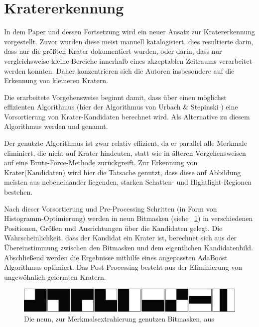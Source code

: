 
\section{Kratererkennung} %
\label{sec:craterdetection}

In dem Paper \cite{bandeira_10} und dessen Fortsetzung \cite{bandeira_12} wird ein neuer Ansatz zur Kratererkennung vorgestellt. Zuvor wurden diese meist manuell katalogisiert, dies resultierte darin, dass nur die größten Krater dokumentiert wurden, oder darin, dass nur vergleichsweise kleine Bereiche innerhalb eines akzeptablen Zeitraums verarbeitet werden konnten. Daher konzentrieren sich die Autoren insbesondere auf die Erkennung von kleineren Kratern.

Die erarbeitete Vorgehensweise beginnt damit, dass über einen möglichst effizienten Algorithmus (hier der Algorithmus von Urbach \& Stepinski \cite{urbach_stepinski_2009}) eine Vorsortierung von Krater-Kandidaten berechnet wird. Als Alternative zu diesem Algorithmus werden \cite{bandeira_07} und \cite{salamuniccar_10} genannt.

Der genutzte Algorithmus ist zwar relativ effizient, da er parallel alle Merkmale eliminiert, die nicht auf Krater hindeuten, statt wie in älteren Vorgehensweisen auf eine Brute-Force-Methode zurückgreift. Zur Erkennung von Krater(Kandidaten) wird hier die Tatsache genutzt, dass diese auf Abbildung meisten aus nebeneinander liegenden, starken Schatten- und Hightlight-Regionen bestehen.

Nach dieser Vorsortierung und Pre-Processing Schritten (in Form von Histogramm-Optimierung) werden in \cite{bandeira_10, bandeira_12} neun Bitmasken (siehe \figurename~\ref{fig:BDS12_01}) in verschiedenen Positionen, Größen und Ausrichtungen über die Kandidaten gelegt. Die Wahrscheinlichkeit, dass der Kandidat ein Krater ist, berechnet sich aus der Übereinstimmung zwischen den Bitmasken und dem eigentlichen Kandidatenbild. Abschließend werden die Ergebnisse mithilfe eines angepassten AdaBoost Algorithmus optimiert. Das Post-Processing besteht aus der Eliminierung von ungewöhnlich geformten Kratern.

\begin{figure}[h]
	\centering
	\includegraphics[width=.8\textwidth,keepaspectratio]{images/BDS12_01.png}
	\caption{Die neun, zur Merkmalsextrahierung genutzen Bitmasken, aus \cite{bandeira_12}}
	\label{fig:BDS12_01}
\end{figure}

